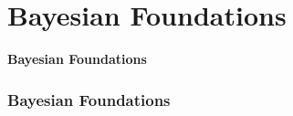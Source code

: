 \section{Bayesian Foundations}
\begin{frame}[plain, c]
    \begin{center}
        \Huge \textcolor{NavyBlue}{\textbf{Bayesian Foundations}}
    \end{center}
\end{frame}

\begin{frame}
    \frametitle{Bayesian Foundations}
\end{frame}